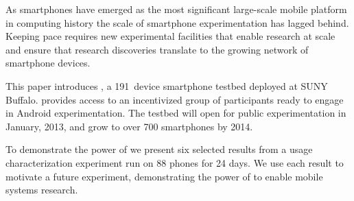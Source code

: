 As smartphones have emerged as the most significant large-scale mobile
platform in computing history the scale of smartphone experimentation has
lagged behind. Keeping pace requires new experimental facilities that enable
research at scale and ensure that research discoveries translate to the
growing network of smartphone devices.


This paper introduces \PhoneLab{}, a 191~device smartphone testbed deployed
at SUNY Buffalo. \PhoneLab{} provides access to an incentivized group of
participants ready to engage in Android experimentation. The testbed will
open for public experimentation in January, 2013, and grow to over 700
smartphones by 2014.



To demonstrate the power of \PhoneLab{} we present six selected results from
a usage characterization experiment run on 88 phones for 24 days. We use each
result to motivate a future \PhoneLab{} experiment, demonstrating the power
of \PhoneLab{} to enable mobile systems research.

